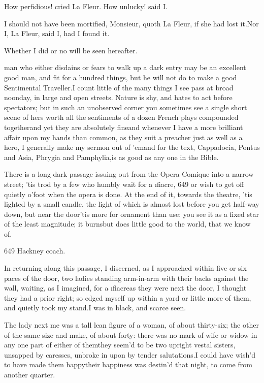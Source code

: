 \documentclass[twoside]{article}
\begin{document}

\tskk How perfidious! cried La Fleur.\tskk
How unlucky! said I.

\tskk I should not have been mortified,
Monsieur, quoth La Fleur, if she had lost
it.\tskk Nor I, La Fleur, said I, had I
found it.

Whether I did or no will be seen
hereafter.





\vskip 6pt


 man who either disdains or
fears to walk up a dark entry may be an
excellent good man, and fit for a hundred
things, but he will not do to make a good
Sentimental Traveller.\tskk I count little
of the many things I see pass at broad
noonday, in large and open streets.\tskk
Nature is shy, and hates to act before
spectators; but in such an unobserved
corner you sometimes see a single short
scene of hers worth all the sentiments of
a dozen French plays compounded
together\tskk and yet they are absolutely
fine\tskk and whenever I have a more
brilliant affair upon my hands than
common, as they suit a preacher just as
well as a hero, I generally make my sermon
out of ’em\tskk and for the text,\tskk
\lqq Cappadocia, Pontus and Asia, Phrygia and
Pamphylia,\rqq \tskk is as good as any one in
the Bible.

There is a long dark passage issuing out
from the Opera Comique into a narrow
street; ’tis trod by a few who humbly wait
for a \i{fiacre}, {649} or wish to get off
quietly o’foot when the opera is done.  At
the end of it, towards the theatre, ’tis
lighted by a small candle, the light of
which is almost lost before you get
half-way down, but near the door\tskk ’tis
more for ornament than use: you see it as
a fixed star of the least magnitude; it
burns\tskk but does little good to the
world, that we know of.

{649}  Hackney coach.

In returning along this passage, I
discerned, as I approached within five or
six paces of the door, two ladies standing
arm-in-arm with their backs against the
wall, waiting, as I imagined, for a
\i{fiacre}\tskk as they were next the
door, I thought they had a prior right; so
edged myself up within a yard or little
more of them, and quietly took my
stand.\tskk I was in black, and scarce
seen.

The lady next me was a tall lean figure of
a woman, of about thirty-six; the other of
the same size and make, of about forty:
there was no mark of wife or widow in any
one part of either of them\tskk they
seem’d to be two upright vestal sisters,
unsapped by caresses, unbroke in upon by
tender salutations.\tskk I could have
wish’d to have made them happy\tskk their
happiness was destin’d that night, to come
from another quarter.
\end{document}

